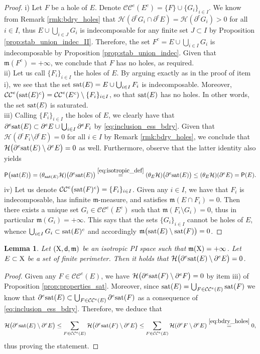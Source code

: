 \documentclass[reqno]{amsart}
\numberwithin{equation}{section}
\newcommand{\X}{{\rm X}}
\newcommand{\sfd}{{\sf d}}
\newcommand{\mm}{\mathfrak m}
\newcommand{\1}{\mathbbm 1}
\renewcommand{\P}{{\sf P}}
\renewcommand{\H}{{\mathcal H}}
\newcommand{\CC}{\mathcal{CC}^e}
\newcommand{\sat}{{\rm sat}}
\newtheorem{lemma}[theorem]{Lemma}
\begin{document}
\begin{proof}
{\color{blue}i)} Let \(F\) be a hole of \(E\). Denote
\(\CC(E^c)=\{F\}\cup\{G_i\}_{i\in I}\). We know from Remark \ref{rmk:bdry_holes}
that \(\H(\partial^e G_i\cap\partial^e E)=\H(\partial^e G_i)>0\) for all \(i\in I\),
thus \(E\cup\bigcup_{i\in J}G_i\) is indecomposable for any finite set \(J\subset I\)
by Proposition \ref{prop:stab_union_indec_II}. Therefore, the set
\(F^c=E\cup\bigcup_{i\in I}G_i\) is indecomposable by Proposition
\ref{prop:stab_union_indec}. Given that \(\mm(F^c)=+\infty\), we conclude that \(F\)
has no holes, as required.\\
{\color{blue}ii)} Let us call \(\{F_i\}_{i\in I}\) the holes of \(E\).
By arguing exactly as in the proof of item i), we see that the set
\(\sat(E)=E\cup\bigcup_{i\in I}F_i\) is indecomposable. Moreover,
\(\CC\big(\sat(E)^c\big)=\CC(E^c)\setminus\{F_i\}_{i\in I}\), so that
\(\sat(E)\) has no holes. In other words, the set \(\sat(E)\) is saturated.\\
{\color{blue}iii)} Calling \(\{F_i\}_{i\in I}\) the holes of \(E\), we clearly have
that \(\partial^e\sat(E)\subset\partial^e E\cup\bigcup_{i\in I}\partial^e F_i\) by
\eqref{eq:inclusion_ess_bdry}. Given that \(\H(\partial^e F_i\setminus\partial^e E)=0\)
for all \(i\in I\) by Remark \ref{rmk:bdry_holes}, we conclude that
\(\H\big(\partial^e\sat(E)\setminus\partial^e E\big)=0\) as well.
Furthermore, observe that the latter identity also yields
\[
\P\big(\sat(E)\big)=(\theta_{\sat(E)}\H)\big(\partial^e\sat(E)\big)
\overset{\eqref{eq:isotropic_def}}=
(\theta_E\H)\big(\partial^e\sat(E)\big)\leq
(\theta_E\H)(\partial^e E)=\P(E).
\]
{\color{blue}iv)} Let us denote \(\CC\big(\sat(F)^c\big)=\{F_i\}_{i\in I}\).
Given any \(i\in I\), we have that \(F_i\) is indecomposable, has infinite
\(\mm\)-measure, and satisfies \(\mm(E\cap F_i)=0\). Then there exists a unique set
\(G_i\in\CC(E^c)\) such that \(\mm(F_i\setminus G_i)=0\), thus in particular
\(\mm(G_i)=+\infty\). This says that the sets \(\{G_i\}_{i\in I}\) cannot be
holes of \(E\), whence \(\bigcup_{i\in I}G_i\subset\sat(E)^c\) and
accordingly \(\mm\big(\sat(E)\setminus\sat(F)\big)=0\).
\end{proof}
%
%
\begin{lemma}
Let \((\X,\sfd,\mm)\) be an isotropic PI space such that \(\mm(\X)=+\infty\).
Let \(E\subset\X\) be a set of finite perimeter. Then it holds that
\(\H\big(\partial^e\sat(E)\setminus\partial^e E\big)=0\).
\end{lemma}
\begin{proof}
Given any \(F\in\CC(E)\), we have \(\H\big(\partial^e\sat(F)\setminus\partial^e F\big)=0\)
by item iii) of Proposition \ref{prop:properties_sat}. Moreover, since
\(\sat(E)=\bigcup_{F\in\CC(E)}\sat(F)\) we know that
\(\partial^e\sat(E)\subset\bigcup_{F\in\CC(E)}\partial^e\sat(F)\) as a consequence of
\eqref{eq:inclusion_ess_bdry}. Therefore, we deduce that
\[
\H\big(\partial^e\sat(E)\setminus\partial^e E\big)
\leq\sum_{F\in\CC(E)}\H\big(\partial^e\sat(F)\setminus\partial^e E\big)
\leq\sum_{F\in\CC(E)}\H(\partial^e F\setminus\partial^e E)
\overset{\eqref{eq:bdry_holes}}=0,
\]
thus proving the statement.
\end{proof}
\end{document}
